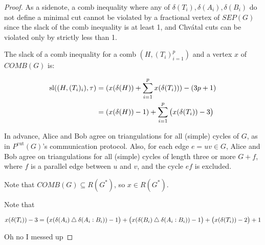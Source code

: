 \documentclass{article}
\DeclareMathOperator{\Sl}{sl}
\begin{document}
\begin{proof}
	As a sidenote, a comb inequality where any
	of $\delta(T_i), \delta(A_i), \delta(B_i)$
	do not define a minimal
	cut cannot be violated  by a fractional
	vertex of $SEP(G)$ since the slack of the comb inequality
	is at least 1, and 
	 Chv\'{a}tal cuts can be violated only by strictly less than 1.

	The slack of a comb inequality for 
	a comb $(H, (T_i)_{i=1}^p)$ and a vertex $x$ of $COMB(G)$ is:

	\begin{align*}
		\Sl((H, (T_i)_i), \tau) &= (x(\delta(H)) + \sum_{i=1}^p x(\delta(T_i))) - (3p+1) \\
		&= (x(\delta(H)) - 1) + \sum_{i=1}^p\del{x(\delta(T_i)) - 3}
	\end{align*}

	In advance, Alice and Bob agree on triangulations for all (simple)
	cycles of $G$,
	as in $P^{\text{cut}}(G)$'s communication protocol. Also,
	for each edge $e=uv\in G$, Alice and Bob agree on triangulations
	for all (simple) cycles of length three or more $G+f$, where $f$ is a parallel
	edge between $u$ and $v$, and the cycle $ef$ is excluded.

	Note that $COMB(G) \subseteq R(G^*)$, so $x\in R(G^*)$.

	Note that

	\begin{align*}
		x(\delta(T_i))- 3 = \del{x(\delta(A_i) \bigtriangleup \delta(A_i:B_i)) - 1} + \del{x(\delta(B_i)\bigtriangleup\delta(A_i:B_i)) - 1} + \del{x(\delta(T_i)) - 2} + 1
	\end{align*}

	Oh  no I messed up
\end{proof}
\end{document}
